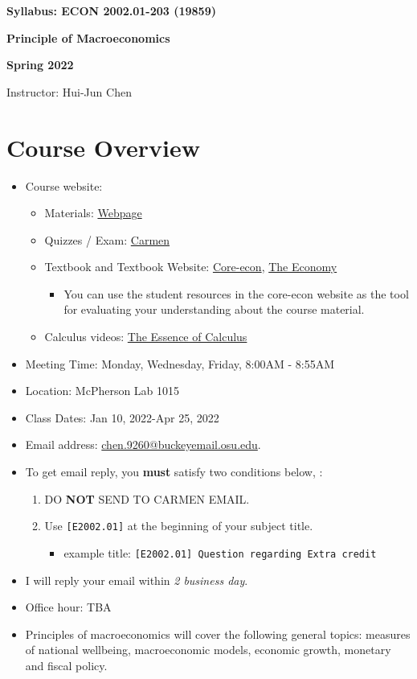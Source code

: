 \documentclass[12pt]{article}
\begin{document}
\centerline{\huge\bf Syllabus: ECON 2002.01-203 (19859)}
\medskip
\centerline{\LARGE \bf Principle of Macroeconomics}
\medskip
\centerline{\LARGE \bf Spring 2022}
\medskip
\centerline{\Large Instructor: Hui-Jun Chen}

\medskip

\section*{Course Overview}
\begin{itemize}

    \item Course website:
    \begin{itemize}
        \item Materials: \href{https://huijunchen9260.github.io/PrincipleMacroSpring2022.html}{Webpage}
        \item Quizzes / Exam: \href{https://osu.instructure.com/courses/114824}{Carmen}
        \item Textbook and Textbook Website: \href{https://www.core-econ.org/}{Core-econ}, \href{https://www.core-econ.org/the-economy/book/text/0-3-contents.html}{The Economy}
        \begin{itemize}
            \item You can use the student resources in the core-econ website as the tool for evaluating your understanding about the course material.
        \end{itemize}
        \item Calculus videos: \href{https://www.youtube.com/watch?v=WUvTyaaNkzM&list=PLZHQObOWTQDMsr9K-rj53DwVRMYO3t5Yr}{The Essence of Calculus}
    \end{itemize}
    \item Meeting Time: Monday, Wednesday, Friday, 8:00AM - 8:55AM
    \item Location: McPherson Lab 1015
    \item Class Dates: Jan 10, 2022-Apr 25, 2022
    \item Email address: \href{chen.9260@buckeyemail.osu.edu}{chen.9260@buckeyemail.osu.edu}.
    \item To get email reply, you \textbf{must} satisfy two conditions below, :
    \begin{enumerate}
        \item DO \textbf{NOT} SEND TO CARMEN EMAIL.
        \item Use \texttt{[E2002.01]} at the beginning of your subject title.
        \begin{itemize}
            \item example title: \texttt{[E2002.01] Question regarding Extra credit}
        \end{itemize}
    \end{enumerate}
    \item I will reply your email within \textit{2 business day}.
    \item Office hour: TBA
    \item Principles of macroeconomics will cover the following general topics: measures of national well\-being, macroeconomic models, economic growth, monetary and fiscal policy.
\end{itemize}
\end{document}
